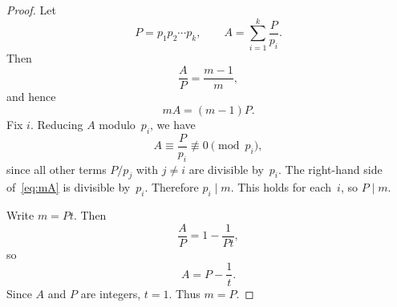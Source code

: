\documentclass[10pt,a4paper]{amsart}
\begin{document}
\begin{proof}
Let
\[
        P=p_1p_2\cdots p_k,
        \qquad
        A=\sum_{i=1}^k\frac{P}{p_i}.
\]
Then
\[
        \frac AP=\frac{m-1}{m},
\]
and hence
\begin{equation}\label{eq:mA}
        mA=(m-1)P.
\end{equation}
Fix $i$.  Reducing $A$ modulo~$p_i$, we have
\[
        A\equiv \frac{P}{p_i}\not\equiv0\pmod {p_i},
\]
since all other terms $P/p_j$ with $j\ne i$ are divisible by~$p_i$.  The right-hand side of~\eqref{eq:mA} is divisible by~$p_i$.  Therefore $p_i\mid m$.  This holds for each~$i$, so $P\mid m$.

Write $m=Pt$.  Then
\[
        \frac AP=1-\frac1{Pt},
\]
so
\[
        A=P-\frac1t.
\]
Since $A$ and $P$ are integers, $t=1$.  Thus $m=P$.
\end{proof}
\end{document}
